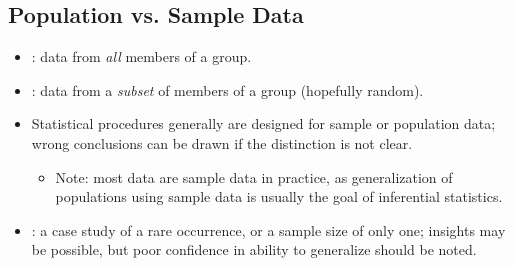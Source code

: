 \begin{itemize}
    \subsection{Population vs. Sample Data}
    \begin{itemize}
      \item {}: data from \emph{all} members of a group.
      \item {}: data from a \emph{subset} of members of a group (hopefully random).
      \item Statistical procedures generally are designed for sample or population data; wrong conclusions can be drawn if the distinction is not clear. 
        \begin{itemize}
          \item Note: most data are sample data in practice, as generalization of populations using sample data is usually the goal of inferential statistics.
        \end{itemize}
      \item {}: a case study of a rare occurrence, or a sample size of only one; insights may be possible, but poor confidence in ability to generalize should be noted.
    \end{itemize}

\end{itemize}

